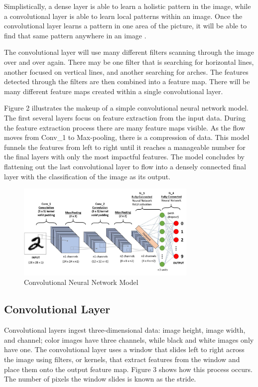 \documentclass[5p,authoryear]{elsarticle}
\begin{document}
Simplistically, a dense layer is able to learn a holistic pattern in the image, while a convolutional layer is able to learn local patterns within an image. Once the convolutional layer learns a pattern in one area of the picture, it will be able to find that same pattern anywhere in an image  \citep{chollet}. 

The convolutional layer will use many different filters scanning through the image over and over again. There may be one filter that is searching for horizontal lines, another focused on vertical lines, and another searching for arches. The features detected through the filters are then combined into a feature map. There will be many different feature maps created within a single convolutional layer.

Figure 2 illustrates the makeup of a simple convolutional neural network model. The first several layers focus on feature extraction from the input data. During the feature extraction process there are many feature maps visible. As the flow moves from Conv\_1 to Max-pooling, there is a compression of data. This model funnels the features from left to right until it reaches a manageable number for the final layers with only the most impactful features. The model concludes by flattening out the last convolutional layer to flow into a densely connected final layer with the classification of the image as its output.


\begin{figure}[!h] 
    \centering
	\includegraphics[width=3.4in]{figures/ConvNet.jpeg}
	\caption[]{Convolutional Neural Network Model} 
	\label{ConvNet} 
\end{figure}



\subsection{Convolutional Layer}

Convolutional layers ingest three-dimensional data: image height, image width, and channel; color images have three channels, while black and white images only have one. The convolutional layer uses a window that slides left to right across the image using filters, or kernels, that extract features from the window and place them onto the output feature map. Figure 3 shows how this process occurs. The number of pixels the window slides is known as the stride.
\end{document}
